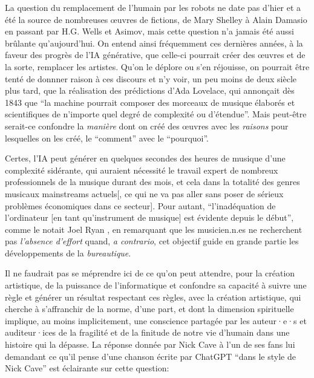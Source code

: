 La question du remplacement de l'humain par les robots ne date pas d'hier et a été la source de nombreuses œuvres de fictions, de Mary Shelley à Alain Damasio en passant par H.G. Wells et Asimov, mais cette question n'a jamais été aussi brûlante qu'aujourd'hui. On entend ainsi fréquemment ces dernières années, à la faveur des progrès de l'IA générative, que celle-ci pourrait créer des œuvres et de la sorte, remplacer les artistes. Qu'on le déplore ou s'en réjouisse, on pourrait être tenté de donnner raison à ces discours et n'y voir, un peu moins de deux siècle plus tard, que la réalisation des prédictions d'Ada Lovelace, qui annonçait dès 1843 que ``la machine pourrait composer des morceaux de musique élaborés et scientifiques de n’importe quel degré de complexité ou d’étendue''\cite{lovelace_translators_1843}. Mais peut-être serait-ce confondre la \textit{manière} dont on créé des œuvres avec les \textit{raisons} pour lesquelles on les créé, le ``comment'' avec le ``pourquoi''.

Certes, l'IA peut générer en quelques secondes des heures de musique d'une complexité sidérante, qui auraient nécessité le travail expert de nombreux professionnels de la musique durant des mois, et cela dans la totalité des genres musicaux mainstreams actuels[, ce qui ne va pas aller sans poser de sérieux problèmes économiques dans ce secteur]. Pour autant, ``l'inadéquation de l'ordinateur [en tant qu'instrument de musique] est évidente depuis le début'', comme le notait Joel Ryan \cite{ryan_remarks_1991}, en remarquant que les musicien.n.es ne recherchent pas \textit{l'absence d'effort} quand, \textit{a contrario}, cet objectif guide en grande partie les développements de la \textit{bureautique}.

Il ne faudrait pas se méprendre ici de ce qu'on peut attendre, pour la création artistique, de la puissance de l'informatique et confondre sa capacité à suivre une règle et générer un résultat respectant ces règles, avec la création artistique, qui cherche à s'affranchir de la norme, d'une part, et dont la dimension spirituelle implique, au moins implicitement, une conscience partagée par les auteur·e·s et auditeur·ices de la fragilité et de la finitude de notre vie d'humain dans une histoire qui la dépasse. La réponse donnée par Nick Cave à l'un de ses fans lui demandant ce qu'il pense d'une chanson écrite par ChatGPT ``dans le style de Nick Cave'' est éclairante sur cette question:


